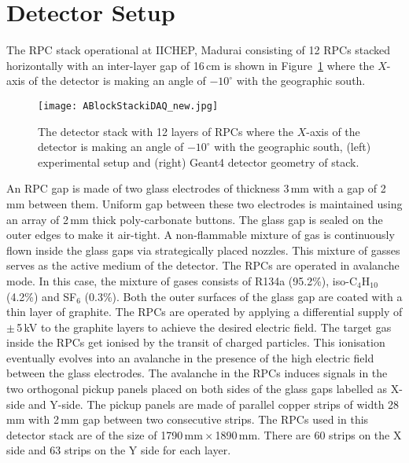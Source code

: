\section{Detector Setup} \label{sec:detectorA}
The RPC stack operational at IICHEP, Madurai consisting of 12 RPCs
stacked horizontally with an inter-layer gap of 16\,cm is shown in
Figure~\ref{fig:stack} where the $X$-axis of the detector is making an
angle of $-10^\circ$ with the geographic south.
\begin{figure}[h]
  \centering
  \texttt{[image: ABlockStackiDAQ\_new.jpg]} 
  \caption{The detector stack with 12 layers of RPCs where the
    $X$-axis of the detector is making an angle of $-10^\circ$ with
    the geographic south, (left) experimental setup and (right) Geant4
    detector geometry of stack.}
  \label{fig:stack}
\end{figure}
An RPC gap is made of two glass electrodes of thickness 3\,mm with
a gap of 2\,mm between them. Uniform gap between these two electrodes
is maintained using an array of 2\,mm thick poly-carbonate buttons.
The glass gap is sealed on the outer edges to make it air-tight.
A non-flammable mixture of gas is continuously
flown inside the glass gaps via strategically placed nozzles.
This mixture of gasses serves as the active medium of the detector.
The RPCs are operated in avalanche mode. In this case, the mixture of
gases consists of R134a (95.2\%), iso-C$_4$H$_{10}$ (4.2\%) and
SF$_6$ (0.3\%). Both the outer surfaces of the glass gap are coated
with a thin layer of graphite. The RPCs are operated by applying
a differential supply of $\pm$\,5\,kV to the graphite layers to
achieve the desired electric field. The target gas inside the RPCs get
ionised by the transit of charged particles. This ionisation eventually
evolves into an avalanche in the presence of the high electric field
between the glass electrodes. The avalanche in the RPCs induces
signals in the two orthogonal pickup panels placed on both sides of
the glass gaps labelled as X-side and Y-side. The pickup
panels are made of parallel copper strips of width 28\,mm with 2\,mm
gap between two consecutive strips. The RPCs used in this detector
stack are of the size of 1790\,mm\,$\times$\,1890\,mm. There are
60 strips on the X side and 63 strips on the Y side for each layer.

